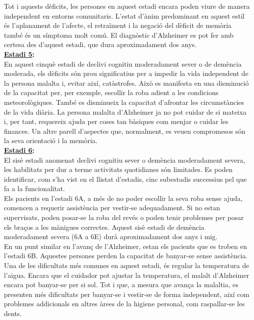 \documentclass[a4paper,12pt]{article}
\begin{document}
Tot i aquests dèficits, les persones en aquest estadi encara poden viure de manera independent en entorns comunitaris. L'estat d'ànim predominant en aquest estil és l'aplanament de l'afecte, el retraïment i la negació del dèficit de memòria també és un símptoma molt comú. El diagnòstic d'Alzheimer es pot fer amb certesa des d'aquest estadi, que dura aproximadament dos anys.\\
\textbf{\underline{Estadi 5}:}\\
En aquest cinquè estadi de declivi cognitiu moderadament sever o de demència moderada, els dèficits són prou significatius per a impedir la vida independent de la persona malalta i, evitar així, catàstrofes. Això es manifesta en una disminució de la capacitat per, per exemple, escollir la roba adient a les condicions meteorològiques. També es disminueix la capacitat d'afrontar les circumstàncies de la vida diària. La persona malalta d'Alzheimer ja no pot cuidar de si mateixa i, per tant, requereix ajuda per coses tan bàsiques com menjar o cuidar les finances. Un altre parell d'aspectes que, normalment, es veuen compromesos són la seva orientació i la memòria.\\
\textbf{\underline{Estadi 6}:}\\
El sisè estadi anomenat declivi cognitiu sever o demència moderadament severa, les habilitats per dur a terme activitats quotidianes són limitades. Es poden identificar, com s'ha vist en el llistat d'estadis, cinc subestadis successius pel que fa a la funcionalitat.\\
Els pacients en l'estadi 6A, a més de no poder escollir la seva roba sense ajuda, comencen a requerir assistència per vestir-se adequadament. Si no estan supervisats, poden posar-se la roba del revés o poden tenir problemes per posar els braços a les mànigues correctes. Aquest sisè estadi de demència moderadament severa (6A a 6E) durà aproximadament dos anys i mig.\\
En un punt similar en l'avanç de l'Alzheimer, estan els pacients que es troben en l'estadi 6B. Aquestes persones perden la capacitat de banyar-se sense assistència. Una de les dificultats més comunes en aquest estadi, és regular la temperatura de l'aigua. Encara que el cuidador pot ajustar la temperatura, el malalt d'Alzheimer encara pot banyar-se per si sol. Tot i que, a mesura que avança la malaltia, es presenten més dificultats per banyar-se i vestir-se de forma independent, així com problemes addicionals en altres àrees de la higiene personal, com raspallar-se les dents.\\
\end{document}
